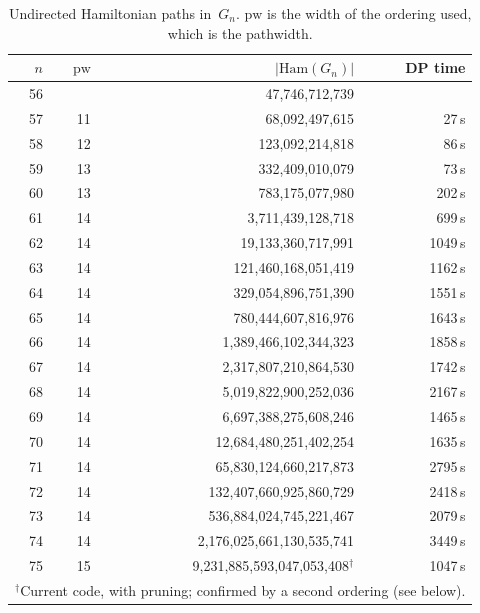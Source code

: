 \documentclass[12pt]{article}
\theoremstyle{definition}
\newcommand{\pw}{\mathrm{pw}}
\begin{document}
\begin{table}[H]
\centering
\caption{Undirected Hamiltonian paths in~$G_n$. $\pw$ is the width of the
ordering used, which is the pathwidth.}
\label{tab:counts}
\begin{tabular}{rrrr}
\toprule
$n$ & $\pw$ & $|\text{Ham}(G_n)|$ & DP time\\
\midrule
56 & & 47{,}746{,}712{,}739 & \\
57 & 11 & 68{,}092{,}497{,}615 & 27\,s\\
58 & 12 & 123{,}092{,}214{,}818 & 86\,s\\
59 & 13 & 332{,}409{,}010{,}079 & 73\,s\\
60 & 13 & 783{,}175{,}077{,}980 & 202\,s\\
61 & 14 & 3{,}711{,}439{,}128{,}718 & 699\,s\\
62 & 14 & 19{,}133{,}360{,}717{,}991 & 1049\,s\\
63 & 14 & 121{,}460{,}168{,}051{,}419 & 1162\,s\\
64 & 14 & 329{,}054{,}896{,}751{,}390 & 1551\,s\\
65 & 14 & 780{,}444{,}607{,}816{,}976 & 1643\,s\\
66 & 14 & 1{,}389{,}466{,}102{,}344{,}323 & 1858\,s\\
67 & 14 & 2{,}317{,}807{,}210{,}864{,}530 & 1742\,s\\
68 & 14 & 5{,}019{,}822{,}900{,}252{,}036 & 2167\,s\\
69 & 14 & 6{,}697{,}388{,}275{,}608{,}246 & 1465\,s\\
70 & 14 & 12{,}684{,}480{,}251{,}402{,}254 & 1635\,s\\
71 & 14 & 65{,}830{,}124{,}660{,}217{,}873 & 2795\,s\\
72 & 14 & 132{,}407{,}660{,}925{,}860{,}729 & 2418\,s\\
73 & 14 & 536{,}884{,}024{,}745{,}221{,}467 & 2079\,s\\
74 & 14 & 2{,}176{,}025{,}661{,}130{,}535{,}741 & 3449\,s\\
75 & 15 & 9{,}231{,}885{,}593{,}047{,}053{,}408$^{\dagger}$ & 1047\,s\\
\bottomrule
\multicolumn{4}{l}{$^{\dagger}$Current code, with pruning; confirmed by a second ordering (see below).}
\end{tabular}
\end{table}
\end{document}
